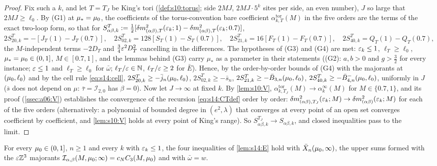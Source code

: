 \begin{proof}
Fix such a $k$, and let $T=T_J$ be King's tori (\cref{def:s10:torus}; side $2MJ$, $2MJ\cdot5^k$ sites per side, an even number), $J$ so large that $2MJ\ge\ell_0$. By (G1) at $\mu_*=\mu_0$, the coefficients of the torus-convention bare coefficient $\alpha^{\mathrm{tor}}_{k,T}(M)$ in the five orders are the terms of the exact two-loop form, so that for $S^T_{\alpha\beta,k}:=\frac12[\delta m^2_{(\alpha\beta),T}(\varepsilon_k;1)-\delta m^2_{(\alpha\beta),T}(\varepsilon_k;0.7)]$,
\[
2S^T_{20,k}=-[J_T(1)-J_T(0.7)],\quad 2S^T_{02,k}=128[S_T(1)-S_T(0.7)],\quad 2S^T_{21,k}=16[F_T(1)-F_T(0.7)],\quad 2S^T_{40,k}=Q_T(1)-Q_T(0.7),
\]
the $M$-independent terms $-2D_T$ and $\frac34\varepsilon^2D_T^2$ cancelling in the differences. The hypotheses of (G3) and (G4) are met: $\varepsilon_k\le1$, $\ell_T\ge\ell_0$, $\mu_*=\mu_0\in(0,1]$, $M\in[0.7,1]$, and the lemmas behind (G3) carry $\mu_*$ as a parameter in their statements ((G2): $a,b>0$ and $g>\frac32$ for every instance; $\varepsilon\le1$ and $\ell_T\ge\ell_0$ for $\bar\omega$; $\ell_T/\varepsilon\in\mathbb N$, $\ell_T/\varepsilon\ge2$ for $\bar E$). Hence, by the order-by-order bounds of (G4) with the majorants at $(\mu_0,\ell_0)$ and by the cell rule \eqref{eq:s14:cell}, $2S^T_{20,k}\ge-\bar j_n(\mu_0,\ell_0)$, $2S^T_{02,k}\ge-\bar s_n$, $2S^T_{21,k}\ge-\bar B_{3,n}(\mu_0,\ell_0)$, $2S^T_{40,k}\ge-\bar B^-_{4,n}(\mu_0,\ell_0)$, uniformly in $J$ ($\bar s$ does not depend on $\mu$: $\bar\tau=\mathcal I_{2,0}$ has $\beta=0$). Now let $J\to\infty$ at fixed $k$. By \cref{lem:s10:V}, $\alpha^{\mathrm{tor}}_{k,T_J}(M)\to\alpha^\infty_k(M)$ for $M\in\{0.7,1\}$, and its proof (\cref{ssec:a06:V}) establishes the convergence of the recursion \eqref{eq:s14:CTdef} order by order: $\delta m^2_{(\alpha\beta),T_J}(\varepsilon_k;M)\to\delta m^2_{(\alpha\beta)}(\varepsilon_k;M)$ for each of the five orders (alternatively: a polynomial of bounded degree in $(e^2,\lambda)$ that converges at every point of an open set converges coefficient by coefficient, and \cref{lem:s10:V} holds at every point of King's range). So $S^{T_J}_{\alpha\beta,k}\to S_{\alpha\beta,k}$, and closed inequalities pass to the limit.
\end{proof}

\begin{lemma}\label{lem:s14:TF}
For every $\mu_0\in(0,1]$, $n\ge1$ and every $k$ with $\varepsilon_k\le1$, the four inequalities of \cref{lem:s14:E} hold with $\bar X_n(\mu_0,\infty)$, the upper sums formed with the $\varepsilon\mathbb Z^3$ majorants $\mathcal I_{\alpha,\beta}(M,\mu_0;\infty)=c_NC_3(M,\mu_0)$ and with $\bar\omega=w$.
\end{lemma}

